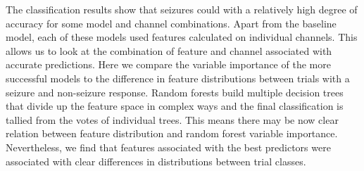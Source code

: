  

The classification results show that seizures could with 
a relatively high degree of accuracy for some model 
and channel combinations. Apart from the baseline 
model, each of these models used features calculated 
on individual channels. This allows us to look at 
the combination of feature and channel 
associated with accurate predictions. Here 
we compare the variable importance of the more successful 
models to the difference in feature distributions 
between trials with a seizure and non-seizure response.
Random forests build multiple decision trees that divide up the feature space in complex ways and the final classification is
tallied from the votes of individual trees. This means there 
may be now clear relation between feature distribution and 
random forest variable importance. Nevertheless, we find that 
features associated with the best predictors were associated
with clear differences in distributions between trial classes.


